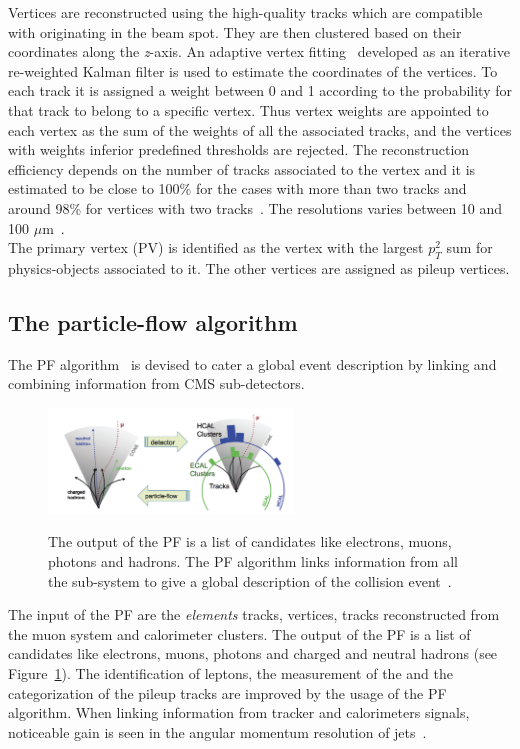 Vertices are reconstructed using the high-quality tracks which are
compatible with originating in the beam spot. They are then clustered
based on their coordinates along the \emph{z}-axis. An adaptive vertex
fitting~\cite{Waltenberger_2007} developed as an iterative re-weighted Kalman filter
is used to estimate the coordinates of the vertices. To each track it is assigned a
weight between 0 and 1 according to the probability for that track to
belong to a specific vertex. Thus vertex weights are appointed to each
vertex as the sum of the weights of all the
associated tracks, and the vertices with weights inferior predefined
thresholds are rejected. The reconstruction efficiency depends on the
number of tracks associated to the vertex and it is estimated to
be close to 100\% for the cases with more than two tracks and around
98\% for vertices with two tracks~\cite{CMS:particleflow}. The
resolutions varies between 10 and 100 $\mu$m~\cite{CMS:particleflow}.\\
The primary vertex (PV) is identified as the vertex with the largest $p^2_T$ sum for
physics-objects associated to it. The other vertices are assigned as pileup
vertices.

\subsection{The particle-flow algorithm}\label{sec:PF}

The PF algorithm~\cite{CMS:particleflow} is devised to cater a global event
description by linking and combining information from CMS
sub-detectors. 
\begin{figure}[h]
\centering
\includegraphics[width=0.58\textwidth]{Figures/c2/pfscheme}\\
\caption{The output of the PF is a list of candidates like
  electrons, muons, photons and hadrons. The PF algorithm links
  information from all the sub-system to give a global description of
  the collision event~\cite{Petrucciani:2650974}.}
\label{fig:pfscheme}
\end{figure} 

The input of the PF are the \emph{elements} tracks, vertices, tracks
reconstructed from the muon system and
calorimeter clusters. The output of the PF is a list of candidates
like electrons, muons, photons and charged and neutral hadrons (see
Figure~\ref{fig:pfscheme}). The identification of leptons, the
measurement of the \ptmiss and the categorization of the pileup tracks
are improved by the usage of the PF algorithm. When linking
information from tracker and calorimeters signals, noticeable gain is seen
in the angular momentum resolution of jets~\cite{CMS:particleflow}.


